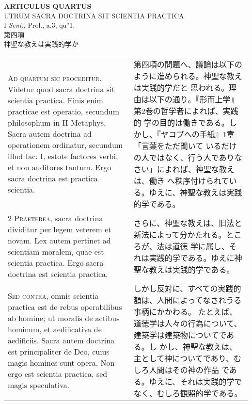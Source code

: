 \documentclass[10pt]{jsarticle}
\begin{document}
\newpage



\begin{center}
 {\Large {\bf ARTICULUS QUARTUS}}\\
 {\large UTRUM SACRA DOCTRINA SIT SCIENTIA PRACTICA}\\
 {\footnotesize I {\itshape Sent.}, Prol., a.3, qu$^a$1.}\\
 {\Large 第四項\\神聖な教えは実践的学か}
\end{center}

\begin{longtable}{p{21em}p{21em}}

{\Huge A}{\scshape d quartum sic proceditur}. Videtur quod sacra
doctrina sit scientia practica. Finis enim practicae est operatio,
secundum philosophum in II Metaphys. Sacra autem doctrina ad
operationem ordinatur, secundum illud Iac. I, estote factores verbi,
et non auditores tantum. Ergo sacra doctrina est practica scientia.



&

第四項の問題へ、議論は以下のように進められる。神聖な教えは実践的学だと
思われる。理由は以下の通り。『形而上学』第2巻の哲学者によれば、実践的
学の目的は働きである。しかし、『ヤコブへの手紙』1章「言葉をただ聞いて
いるだけの人ではなく、行う人でありなさい」によれば、神聖な教えは、働き
へ秩序付けられている。ゆえに、神聖な教えは実践的学である。


\\


{\scshape 2 Praeterea}, sacra doctrina dividitur per legem veterem et
novam. Lex autem pertinet ad scientiam moralem, quae est scientia
practica. Ergo sacra doctrina est scientia practica.


&

さらに、神聖な教えは、旧法と新法によって分かたれる。ところが、法は道徳
学に属し、それは実践的学である。ゆえに神聖な教えは実践的学である。



\\


{\scshape Sed contra}, omnis scientia practica est de
rebus operabilibus ab homine; ut moralis de actibus hominum, et
aedificativa de aedificiis. Sacra autem doctrina est principaliter de
Deo, cuius magis homines sunt opera. Non ergo est scientia practica, sed
magis speculativa.


&

しかし反対に、すべての実践的額は、人間によってなされうる事柄にかかわる。
たとえば、道徳学は人々の行為について、建築学は建築物についてである。し
かし、神聖な教えは、主として神についてであり、むしろ人間はその神の作品
である。ゆえに、それは実践的学でなく、むしろ観照的学である。



\end{longtable}
\end{document}
